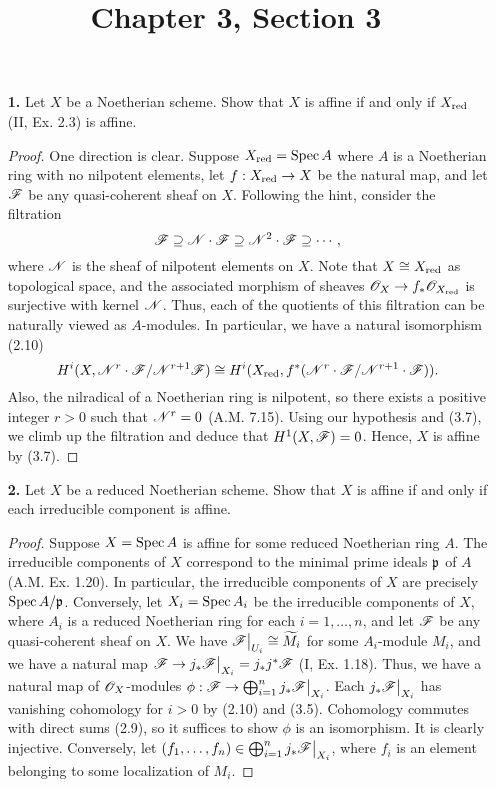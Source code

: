 \documentclass{article}
\title{Chapter 3, Section 3}
\begin{document}
\maketitle
\begin{enumerate} [label=\textbf{\arabic*.}, leftmargin=0em]

\item[\textbf{1.}] Let $X$ be a Noetherian scheme.
Show that $X$ is affine if and only if $X_{\text{red}}$ (II, Ex. 2.3) is affine.

\begin{proof}
  One direction is clear.
  Suppose $X_{\text{red}} = \operatorname{Spec}{A}$ where $A$ is a Noetherian ring with no nilpotent elements, let $f : X_{\text{red}} \to X$ be the natural map, and let $\mathscr{F}$ be any quasi-coherent sheaf on $X$. 
  Following the hint, consider the filtration
  \begin{equation*}
    \mathscr{F} \supseteq \mathscr{N} \cdot \mathscr{F} \supseteq \mathscr{N}^2 \cdot \mathscr{F} \supseteq \cdots,
  \end{equation*}
  where $\mathscr{N}$ is the sheaf of nilpotent elements on $X$.
  Note that $X \cong X_{\text{red}}$ as topological space, and the associated morphism of sheaves $\mathscr{O}_X \to f_* \mathscr{O}_{X_{\text{red}}}$ is surjective with kernel $\mathscr{N}$.
  Thus, each of the quotients of this filtration can be naturally viewed as $A$-modules.
  In particular, we have a natural isomorphism (2.10) $$H^i(X, \mathscr{N}^r \cdot \mathscr{F} / \mathscr{N}^{r + 1} \mathscr{F}) \cong H^i(X_{\text{red}}, f^*(\mathscr{N}^r \cdot \mathscr{F} / \mathscr{N}^{r + 1} \cdot \mathscr{F})).$$
  Also, the nilradical of a Noetherian ring is nilpotent, so there exists a positive integer $r > 0$ such that $\mathscr{N}^r = 0$ (A.M. 7.15).
  Using our hypothesis and (3.7), we climb up the filtration and deduce that $H^1(X, \mathscr{F}) = 0$.
  Hence, $X$ is affine by (3.7).
\end{proof}

\item[\textbf{2.}] Let $X$ be a reduced Noetherian scheme.
Show that $X$ is affine if and only if each irreducible component is affine.

\begin{proof}
Suppose $X = \operatorname{Spec}{A}$ is affine for some reduced Noetherian ring $A$.
The irreducible components of $X$ correspond to the minimal prime ideals $\mathfrak{p}$ of $A$ (A.M. Ex. 1.20).
In particular, the irreducible components of $X$ are precisely $\operatorname{Spec}{A / \mathfrak{p}}$.
Conversely, let $X_i = \operatorname{Spec}{A_i}$ be the irreducible components of $X$, where $A_i$ is a reduced Noetherian ring for each $i = 1, \dots, n$, and let $\mathscr{F}$ be any quasi-coherent sheaf on $X$.
We have $\restr{\fF}{U_i} \cong \widetilde{M}_i$ for some $A_i$-module $M_i$, and we have a natural map $\fF \to j_* \restr{\fF}{X_i} = j_* j^* \fF$ (I, Ex. 1.18). Thus, we have a natural map of $\mathscr{O}_X$-modules $\phi : \fF \to \bigoplus_{i = 1}^n j_* \restr{\fF}{X_i}$. Each $j_* \restr{\fF}{X_i}$ has vanishing cohomology for $i > 0$ by (2.10) and (3.5). Cohomology commutes with direct sums (2.9), so it suffices to show $\phi$ is an isomorphism. It is clearly injective. Conversely, let $(f_1, \dots, f_n) \in \bigoplus_{i = 1}^n j_* \restr{\fF}{X_i}$, where $f_i$ is an element belonging to some localization of $M_i$.



\end{proof}
\end{enumerate}
\end{document}
